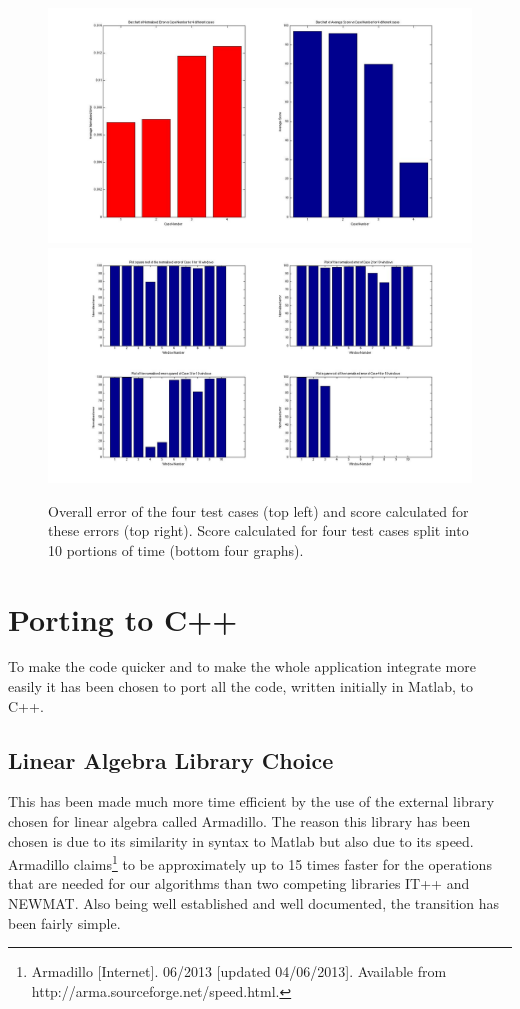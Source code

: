 \documentclass[11pt,a4paper]{article}
\begin{document}
\begin{figure}[H]
\centering
\includegraphics[scale=0.15]{Data_Analysis_Average_Score.jpg}
\includegraphics[scale=0.15]{Data_Analysis_Window_Score.jpg}

\caption{Overall error of the four test cases (top left) and score calculated for these errors (top right). Score calculated for four test cases split into 10 portions of time (bottom four graphs).}
\label{error_score}
\end{figure}

\clearpage
\section{Porting to C++}
\noindent
To make the code quicker and to make the whole application integrate more easily it has been chosen to port all the code, written initially in Matlab, to C++. 
\subsection{Linear Algebra Library Choice}
This has been made much more time efficient by the use of the external library chosen for linear algebra called Armadillo.  The reason this library has been chosen is due to its similarity in syntax to Matlab but also due to its speed. Armadillo claims\footnote{Armadillo [Internet]. 06/2013 [updated 04/06/2013]. Available from http://arma.sourceforge.net/speed.html.} to be approximately up to 15 times faster for the operations that are needed for our algorithms than two competing libraries IT++ and NEWMAT. Also being well established and well documented, the transition has been fairly simple.  
\end{document}
